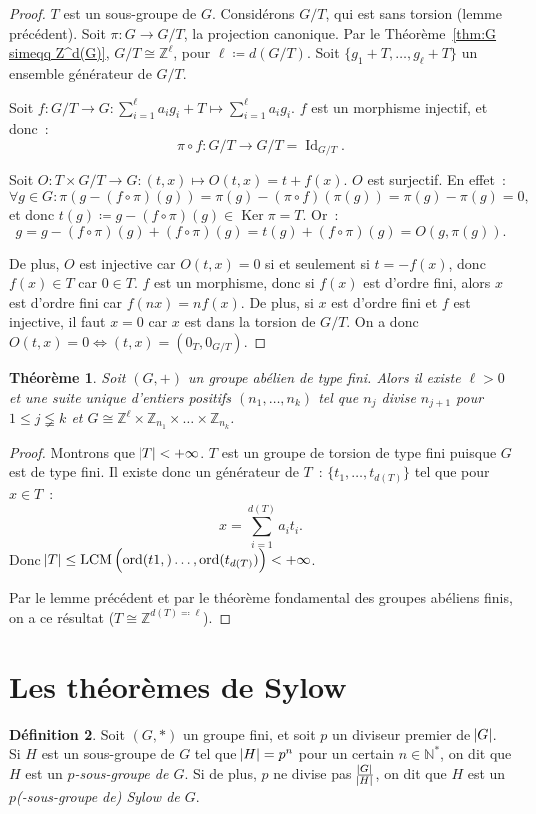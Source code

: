 \documentclass{article}
\newtheorem{thm}{Théorème}[section]
\theoremstyle{definition}
\newtheorem{déf}[thm]{Définition}
\theoremstyle{remark}
\DeclareMathOperator{\Id}{Id}
\DeclareMathOperator{\ord}{ord}
\DeclareMathOperator{\Ker}{Ker}
\DeclareMathOperator{\LCM}{LCM}
\newcommand{\Z}{\mathbb Z}
\newcommand{\N}{\mathbb N}
\newcommand{\simeqq}{\cong}
\begin{document}
		\begin{proof} $T$ est un sous-groupe de $G$. Considérons $G/T$, qui est sans torsion (lemme précédent). Soit $\pi : G \to G/T$, la projection canonique.
		Par le Théorème~\ref{thm:G simeqq Z^d(G)}, $G/T \simeqq \Z^\ell$, pour $\ell \coloneqq d(G/T)$. Soit $\{g_1+T, \ldots, g_\ell+T\}$ un ensemble
		générateur de $G/T$.

		Soit $f : G/T \to G : \sum_{i=1}^\ell a_ig_i + T \mapsto \sum_{i=1}^\ell a_ig_i$. $f$ est un morphisme injectif, et donc~:
		\[\pi \circ f : G/T \to G/T = \Id_{G/T}.\]

		Soit $O : T \times G/T \to G : (t, x) \mapsto O(t, x) = t+f(x)$. $O$ est surjectif. En effet~:
		\[\forall g \in G : \pi(g-(f \circ \pi)(g)) = \pi(g) - (\pi \circ f)(\pi(g)) = \pi(g) - \pi(g) = 0,\]
		et donc $t(g) \coloneqq g - (f \circ \pi)(g) \in \Ker \pi = T$. Or~:
		\[g = g - (f \circ \pi)(g) + (f \circ \pi)(g) = t(g) + (f \circ \pi)(g) = O(g, \pi(g)).\]

		De plus, $O$ est injective car $O(t, x) = 0$ si et seulement si $t = -f(x)$, donc $f(x) \in T$ car $0 \in T$. $f$ est un morphisme, donc si $f(x)$ est
		d'ordre fini, alors $x$ est d'ordre fini car $f(nx) = nf(x)$. De plus, si $x$ est d'ordre fini et $f$ est injective, il faut $x=0$ car $x$ est dans
		la torsion de $G/T$. On a donc $O(t, x) = 0 \iff (t, x) = (0_T, 0_{G/T})$.
		\end{proof}

		\begin{thm} Soit $(G, +)$ un groupe abélien de type fini. Alors il existe $\ell > 0$ et une suite unique d'entiers positifs $(n_1, \ldots, n_k)$
		tel que $n_j$ divise $n_{j+1}$ pour $1  \leq j \lneqq k$ et $G \simeqq \Z^\ell \times \Z_{n_1} \times \ldots \times \Z_{n_k}$.
		\end{thm}

		\begin{proof} Montrons que $\abs T < +\infty$. $T$ est un groupe de torsion de type fini puisque $G$ est de type fini.
		Il existe donc un générateur de $T$~: $\{t_1, \ldots, t_{d(T)}\}$ tel que pour $x \in T$~:
		\[x = \sum_{i=1}^{d(T)}a_it_i.\]
		Donc $\abs T \leq \LCM\left(\ord(t1,) \ldots, \ord(t_{d(T)})\right) < +\infty$.

		Par le lemme précédent et par le théorème fondamental des groupes abéliens finis, on a ce résultat ($T \simeqq \Z^{d(T) \eqqcolon \ell}$).
		\end{proof}

\section{Les théorèmes de Sylow}
	\begin{déf} Soit $(G, *)$ un groupe fini, et soit $p$ un diviseur premier de $\abs G$. Si $H$ est un sous-groupe de $G$ tel que $\abs H = p^n$ pour un
	certain $n \in \N^*$, on dit que $H$ est un \textit{$p$-sous-groupe de $G$}. Si de plus, $p$ ne divise pas $\frac {\abs G}{\abs H}$, on dit que $H$ est un
	\textit{$p$(-sous-groupe de) Sylow de $G$}.
	\end{déf}
\end{document}

